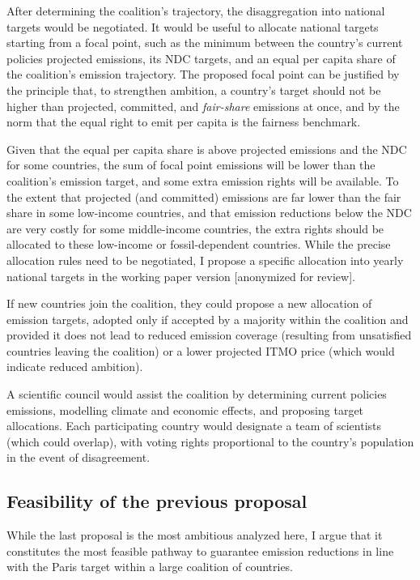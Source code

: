 ﻿\documentclass[12pt,english]{article}
\begin{document}
After determining the coalition's trajectory, the disaggregation into national targets would be negotiated. It would be useful to allocate national targets starting from a focal point, such as  %
the minimum between the country's current policies projected emissions, its NDC targets, and an equal per capita share of the coalition's emission trajectory. 
The proposed focal point can be justified by the principle that, to strengthen ambition, a country's target should not be higher than projected, committed, and \textit{fair-share} emissions at once, and by the norm that the equal right to emit per capita is the fairness benchmark. %

Given that the equal per capita share is above projected emissions %
and the NDC for some countries, the sum of focal point emissions will be lower than the coalition's emission target, and some extra emission rights will be available. To the extent that projected (and committed) emissions are far lower than the fair share in some low-income countries, and that emission reductions below the NDC are very costly for some middle-income countries, the extra rights should be allocated to these low-income or fossil-dependent countries. While the precise allocation rules need to be negotiated, I propose a specific allocation into yearly national targets in the working paper version [anonymized for review]. %

If new countries join the coalition, they could propose a new allocation of emission targets, adopted only if accepted by a majority within the coalition and provided it does not lead to reduced emission coverage (resulting from unsatisfied countries leaving the coalition) or a lower projected ITMO price (which would indicate reduced ambition). %

A scientific council would assist the coalition by determining current policies emissions, modelling climate and economic effects, and proposing target allocations. Each participating country would designate a team of scientists (which could overlap), with voting rights proportional to the country's population in the event of disagreement.

\subsection{Feasibility of the previous proposal\label{subsec:feasibility}}

While the last proposal is the most ambitious analyzed here, I argue that it constitutes the most feasible pathway to guarantee emission reductions in line with the Paris target within a large coalition of countries. 
\end{document}
